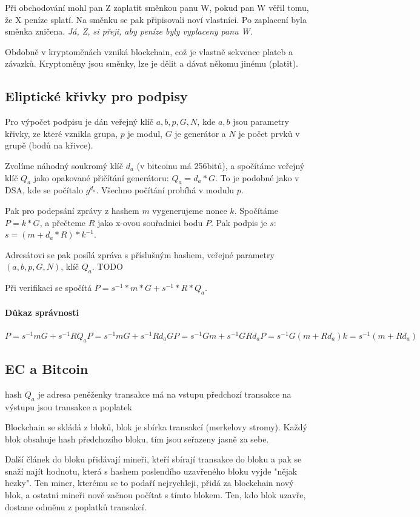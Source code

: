 Při obchodování mohl pan Z zaplatit směnkou panu W, pokud pan W věřil tomu, že X peníze splatí. Na směnku se pak připisovali noví vlastníci. Po zaplacení byla směnka zničena. \textit{Já, Z, si přeji, aby peníze byly vyplaceny panu W.}

Obdobně v kryptoměnách vzniká blockchain, což je vlastně sekvence plateb a závazků. Kryptoměny jsou směnky, lze je dělit a dávat někomu jinému (platit).

\subsection{Eliptické křivky pro podpisy}

Pro výpočet podpisu je dán veřejný klíč $a, b, p, G, N$, kde $a, b$ jsou parametry křivky, ze které vznikla grupa, $p$ je modul, $G$ je generátor a $N$ je počet prvků v grupě (bodů na křivce).

Zvolíme náhodný soukromý klíč $d_a$ (v bitcoinu má 256bitů), a spočítáme veřejný klíč $Q_a$ jako opakované přičítání generátoru: $Q_a = d_a * G$. To je podobné jako v DSA, kde se počítalo $g^{d_a}$. Všechno počítání probíhá v modulu $p$.

Pak pro podepsání zprávy z hashem $m$ vygenerujeme nonce $k$. Spočítáme $P = k * G$, a přečteme $R$ jako x-ovou souřadnici bodu $P$. Pak podpis je $s$: $s = (m + d_a * R) * k^{-1}$.

Adresátovi se pak posílá zpráva s příslušným hashem, veřejné parametry $(a, b, p, G, N)$, klíč $Q_a$.
TODO

Při verifikaci se spočítá $P = s^{-1} * m * G + s^{-1} * R * Q_a$.

\paragraph{Důkaz správnosti}
$
P = s^{-1} m G + s^{-1} R Q_a
P = s^{-1} m G + s^{-1} R d_a G
P = s^{-1} G m + s^{-1} G R d_a
P = s^{-1} G (m + R d_a)
k = s^{-1} (m + R d_a)$

\subsection{EC a Bitcoin}

hash $Q_a$ je adresa peněženky
transakce má na vstupu předchozí transakce
na výstupu jsou transakce a poplatek

Blockchain se skládá z bloků, blok je sbírka transakcí (merkelovy stromy). Každý blok obsahuje hash předchozího bloku, tím jsou seřazeny jasně za sebe.

Další článek do bloku přidávají mineři, kteří sbírají transakce do bloku a pak se snaží najít hodnotu, která s hashem poslendího uzavřeného bloku vyjde "nějak hezky". Ten miner, kterému se to podaří nejrychleji, přidá za blockchain nový blok, a ostatní mineři nově začnou počítat s tímto blokem. Ten, kdo blok uzavře, dostane odměnu z poplatků transakcí.


